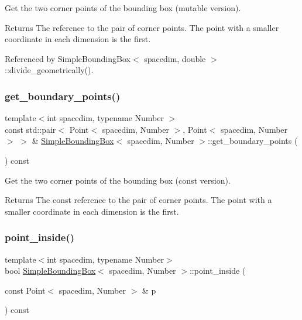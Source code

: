 Get the two corner points of the bounding box (mutable version). \begin{DoxyReturn}{Returns}
The reference to the pair of corner points. The point with a smaller coordinate in each dimension is the first. 
\end{DoxyReturn}


Referenced by Simple\+Bounding\+Box$<$ spacedim, double $>$\+::divide\+\_\+geometrically().

\mbox{\label{classSimpleBoundingBox_a7c1af5d42bfc12cd3d0c955863fe0d75}} 
\subsubsection{\texorpdfstring{get\+\_\+boundary\+\_\+points()}{get\_boundary\_points()}\hspace{0.1cm}{\footnotesize\ttfamily [2/2]}}
{\footnotesize\ttfamily template$<$int spacedim, typename Number $>$ \\
const std\+::pair$<$ Point$<$ spacedim, Number $>$, Point$<$ spacedim, Number $>$ $>$ \& \hyperlink{classSimpleBoundingBox}{Simple\+Bounding\+Box}$<$ spacedim, Number $>$\+::get\+\_\+boundary\+\_\+points (\begin{DoxyParamCaption}{ }\end{DoxyParamCaption}) const}

Get the two corner points of the bounding box (const version). \begin{DoxyReturn}{Returns}
The const reference to the pair of corner points. The point with a smaller coordinate in each dimension is the first. 
\end{DoxyReturn}
\mbox{\label{classSimpleBoundingBox_af58f37fb60a09a61730797850886c39f}} 
\subsubsection{\texorpdfstring{point\+\_\+inside()}{point\_inside()}}
{\footnotesize\ttfamily template$<$int spacedim, typename Number$>$ \\
bool \hyperlink{classSimpleBoundingBox}{Simple\+Bounding\+Box}$<$ spacedim, Number $>$\+::point\+\_\+inside (\begin{DoxyParamCaption}\item[{const Point$<$ spacedim, Number $>$ \&}]{p }\end{DoxyParamCaption}) const}

